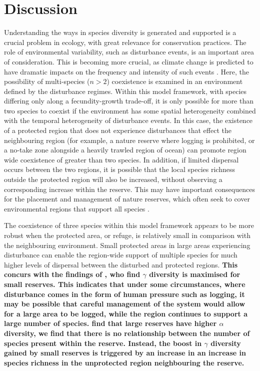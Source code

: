 \section{Discussion}
Understanding the ways in species diversity is generated and supported is a crucial problem in ecology, with great relevance for conservation practices. The role of environmental variability, such as disturbance events, is an important area of consideration. This is becoming more crucial, as climate change is predicted to have dramatic impacts on the frequency and intensity of such events \citep[e.g.][]{webster2005changes}. Here, the possibility of multi-species ($n>2$) coexistence is examined in an environment defined by the disturbance regimes. Within this model framework, with species differing only along a fecundity-growth trade-off, it is only possible for more than two species to coexist if the environment has some spatial heterogeneity combined with the temporal heterogeneity of disturbance events. In this case, the existence of a protected region that does not experience disturbances that effect the neighbouring region (for example, a nature reserve where logging is prohibited, or a no-take zone alongside a heavily trawled region of ocean) can promote region wide coexistence of greater than two species. In addition, if limited dispersal occurs between the two regions, it is possible that the local species richness outside the protected region will also be increased, without observing a corresponding increase within the reserve. This may have important consequences for the placement and management of nature reserves, which often seek to cover environmental regions that support all species \citep[e.g.][]{margules1988selecting,scott2001nature}.

The coexistence of three species within this model framework appears to be more robust when the protected area, or refuge, is relatively small in comparison with the neighbouring environment. Small protected areas in large areas experiencing disturbance can enable the region-wide support of multiple species for much higher levels of dispersal between the disturbed and protected regions. \textbf{This concurs with the findings of \cite{lasky2013reserve}, who find $\gamma$ diversity is maximised for small reserves. This indicates that under some circumstances, where disturbance comes in the form of human pressure such as logging, it may be possible that careful management of the system would allow for a large area to be logged, while the region continues to support a large number of species.
\cite{lasky2013reserve} find that large reserves have higher $\alpha$ diversity, we find that there is no relationship between the number of species present within the reserve. Instead, the boost in $\gamma$ diversity gained by small reserves is triggered by an increase in an increase in species richness in the unprotected region neighbouring the reserve.}

